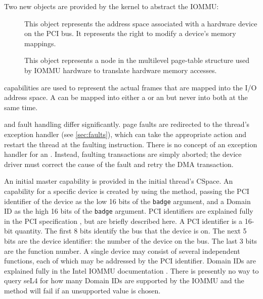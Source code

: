 Two new objects are provided by the kernel to abstract the IOMMU:
\begin{description}

    \item[] This object represents the address space associated
    with a hardware device on the PCI bus. It represents the right to
    modify a device's memory mappings.

    \item[] This object represents a node in the multilevel
    page-table structure used by IOMMU hardware to translate hardware
    memory accesses.

\end{description}

 capabilities are used to represent the actual frames that are
mapped into the I/O address space. A  can be mapped into
either a  or an  but never into both at the same time.

 and  fault handling differ significantly.
 page faults are redirected to the thread's exception handler (see \autoref{sec:faults}), 
which can take the
appropriate action and restart the thread at the faulting instruction.
There is no concept of an exception handler for an . Instead, faulting
transactions are simply
aborted; the device driver must correct the cause of the fault and retry
the DMA transaction.

An initial master  capability is provided in the initial thread's
CSpace. An  capability for a specific device is created by
using the  method, passing the
PCI identifier of the device as the low 16 bits of the \texttt{badge} argument, and
a Domain ID as the high 16 bits of the \texttt{badge} argument.
PCI identifiers are explained fully in the PCI specification 
\cite{Shanley:PCISA}, but are briefly described here. A PCI identifier is
a 16-bit quantity.  The first 8 bits identify the bus that the device is on.
The next 5 bits are the device identifier: the number of the device on
the bus. The last 3 bits are the function number. A single device may
consist of several independent functions, each of which may be addressed
by the PCI identifier.
Domain IDs are explained fully in the Intel IOMMU documentation \cite{extra:vtd}.
There is presently no way to query seL4 for how many Domain IDs are supported by
the IOMMU and the  method will fail if an
unsupported value is chosen.

